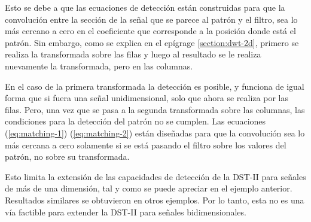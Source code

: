 Esto se debe a que las ecuaciones de detección están 
construidas para que la convolución entre la sección de la señal que se parece al patrón y 
el filtro, sea lo más cercano a cero en el coeficiente que corresponde a la posición donde está el patrón.
Sin embargo, como se explica en el epígrage \ref{section:dwt-2d}, primero se realiza la transformada sobre las filas y 
luego al resultado
se le realiza nuevamente la transformada, pero en las columnas. 

En el caso de la primera transformada la detección es posible, y funciona de igual forma que si fuera una señal
unidimensional, solo que ahora se realiza por las filas. 
Pero, una vez que se pasa a la segunda transformada sobre las columnas, las condiciones para la detección del patrón no se cumplen.
Las ecuaciones (\ref{eq:matching-1}) (\ref{eq:matching-2}) están diseñadas para que la convolución sea lo más cercana 
a cero solamente si se está pasando el filtro sobre los valores del patrón, no sobre su transformada.

Esto limita la extensión de las capacidades de detección de la DST-II para señales de más de una dimensión, 
tal y como se puede
apreciar en el ejemplo anterior. Resultados similares se obtuvieron en otros ejemplos. Por lo tanto, esta no es una 
vía factible para extender la DST-II para señales bidimensionales.


